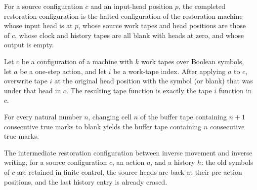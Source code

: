 \begin{definition}
\label{Complexity.enumCont_undoResult}
\leanok
{}
For a source configuration $c$ and an input-head position $p$, the completed
restoration configuration is the halted configuration of the restoration machine
whose input head is at $p$, whose source work tapes and head positions are those
of $c$, whose clock and history tapes are all blank with heads at zero, and whose
output is empty.
\end{definition}

\begin{lemma}
\label{Complexity.enumCont_restore_cell}
\leanok
{}
Let $c$ be a configuration of a machine with $k$ work tapes over Boolean symbols, let
$a$ be a one-step action, and let $i$ be a work-tape index. After applying $a$ to $c$,
overwrite tape $i$ at the original head position with the symbol (or blank) that was
under that head in $c$. The resulting tape function is exactly the tape $i$ function in
$c$.
\end{lemma}

\begin{lemma}
\label{Complexity.enumCont_clock_erase}
\leanok
{}
For every natural number $n$, changing cell $n$ of the buffer tape containing $n+1$
consecutive true marks to blank yields the buffer tape containing $n$ consecutive true
marks.
\end{lemma}

\begin{definition}
\label{Complexity.enumCont_undoMid}
\leanok
{}
The intermediate restoration configuration between inverse movement and inverse
writing, for a source configuration $c$, an action $a$, and a history $h$: the
old symbols of $c$ are retained in finite control, the source heads are back at
their pre-action positions, and the last history entry is already erased.
\end{definition}


